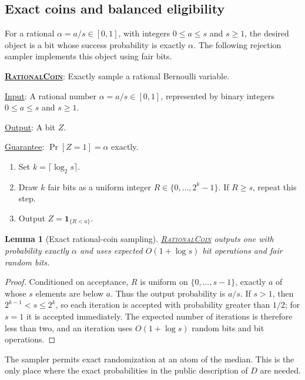 \documentclass[11pt]{article}
\newenvironment{fminipage}%
  {\begin{Sbox}\begin{minipage}}%
  {\end{minipage}\end{Sbox}\fbox{\TheSbox}}
\newenvironment{algbox}[0]{%
\vskip 0.2in
\noindent
\begin{fminipage}{6.3in}
}{%
\end{fminipage}
\vskip 0.2in
}
\newtheorem{lemma}{Lemma}[section]
\begin{document}
\subsection{Exact coins and balanced eligibility}

For a rational $\alpha=a/s\in[0,1]$, with integers $0\le a\le s$ and
$s\ge1$, the desired object is a bit whose success probability is exactly
$\alpha$.  The following rejection sampler implements this object using fair
bits.

\begin{algbox}
\label{alg:rational-coin}
\textbf{\uline{\textsc{RationalCoin}}}: Exactly sample a rational Bernoulli
variable.

\uline{Input}: A rational number $\alpha=a/s\in[0,1]$, represented by binary
integers $0\le a\le s$ and $s\ge1$.

\uline{Output}: A bit $Z$.

\uline{Guarantee}: $\Pr[Z=1]=\alpha$ exactly.
\begin{enumerate}
  \item Set $k=\lceil\log_2 s\rceil$.
  \item Draw $k$ fair bits as a uniform integer
  $R\in\{0,\ldots,2^k-1\}$.  If $R\ge s$, repeat this step.
  \item Output $Z=\mathbf{1}_{\{R<a\}}$.
\end{enumerate}
\end{algbox}

\begin{lemma}[Exact rational-coin sampling]
\label{lem:rational-coin}
\hyperref[alg:rational-coin]{\textsc{RationalCoin}} outputs one with
probability exactly $\alpha$ and uses expected $O(1+\log s)$ bit operations
and fair random bits.
\end{lemma}

\begin{proof}
Conditioned on acceptance, $R$ is uniform on $\{0,\ldots,s-1\}$, exactly $a$
of whose $s$ elements are below $a$.  Thus the output probability is $a/s$.
If $s>1$, then $2^{k-1}<s\le2^k$, so each iteration is accepted with
probability greater than $1/2$; for $s=1$ it is accepted immediately.  The
expected number of iterations is therefore less than two, and an iteration
uses $O(1+\log s)$ random bits and bit operations.
\end{proof}

The sampler permits exact randomization at an atom of the median.  This is the
only place where the exact probabilities in the public description of $D$ are
needed.
\end{document}
